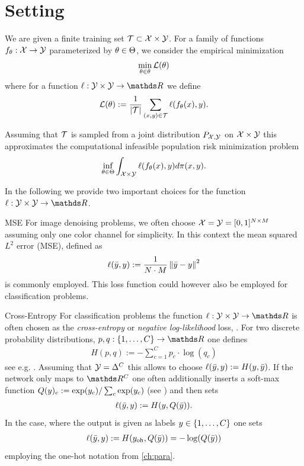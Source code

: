 \section{Setting}\label{sec:SLSet}
%
We are given a finite training set $\mathcal{T}\subset\mathcal{X}\times\mathcal{Y}$. For a family of functions $f_\theta:\mathcal{X}\to\mathcal{Y}$ parameterized by $\theta\in \Theta$, we consider the empirical  minimization
%
\begin{align*}
\min_{\theta\in\theta} \mathcal{L}(\theta) 
\end{align*} 
%
where for a function $\ell:\OutSpace\times\OutSpace\to\R$ we define
\begin{align}\label{eq:empLoss}
\mathcal{L}(\theta)  := \frac{1}{\left|\mathcal{T}\right|}\sum_{(x,y)\in \mathcal{T}} \ell(f_\theta(x), y).
\end{align}
%
%
\begin{remark}{}{}
%
Assuming that $\mathcal{T}$ is sampled from a joint distribution $P_{\mathcal{X},\mathcal{\mathcal{Y}}}$ on $\mathcal{X}\times\mathcal{\mathcal{Y}}$ this approximates the computational infeasible population risk minimization problem
%
\begin{align*}
\inf_{\theta\in\Theta}\int_{\mathcal{X}\times\mathcal{Y}} \ell(f_\theta(x), y) d\pi(x,y).
\end{align*}
\end{remark}
%
%
\noindent%
In the following we provide two important choices for the function $\ell:\Oup\times\Oup\to\R$.
%
%
\begin{example}{MSE}{}
For image denoising problems, we often choose $\mathcal{X}=\mathcal{\mathcal{Y}}=[0,1]^{N\times M}$ assuming only one color channel for simplicity. In this context the mean squared $L^2$ error (MSE), defined as
%
\begin{align*}
\ell(\bar{y},y) := \frac{1}{N\cdot M} \left\|\bar{y}-y\right\|^2
\end{align*}
%
is commonly employed. This loss function could however also be employed for classification problems.
\end{example}
%
%
\begin{example}{Cross-Entropy}{}
For classification problems the function $\ell:\Oup\times\Oup\to\R$ is often chosen as the \emph{cross-entropy} or \emph{negative log-likelihood} loss, \cite{good1952rational}. For two discrete probability distributions, $p,q:\{1,\ldots,C\}\to\R$ one defines
%
\begin{align*}
H(p,q) := -\sum_{c=1}^C p_c\cdot \log(q_c)
\end{align*}
%
see e.g. \cite{cybenko1998mathematics}. Assuming that $\mathcal{\mathcal{Y}}=\Delta^C$ this allows to choose $\ell(\bar{y},y):=H(y, \bar{y})$. If the network only maps to $\R^C$ one often additionally inserts a soft-max function $Q(y)_c:= \exp(y_c)/\sum_c \exp(y_c)$ (see \cite{boltzmann1868studien}) and then sets
%
\begin{align*}
\ell(\bar{y}, y) := H(y, Q(\bar{y})).
\end{align*}
%
In the case, where the output is given as labels $y\in\{1,\ldots,C\}$ one sets
%
\begin{align*}
\ell(\bar{y}, y) := H(y_{{\operatorname{oh}}}, Q(\bar{y})) = -\log(Q(\bar{y}))
\end{align*}
%
employing the one-hot notation from \cref{ch:para}.
%
\end{example}
%
%
